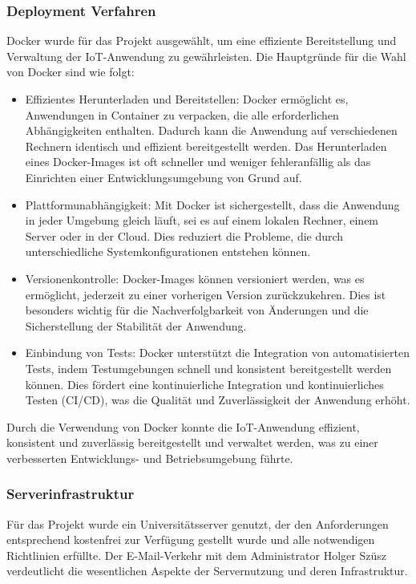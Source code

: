 \subsubsection{Deployment Verfahren}
Docker wurde für das Projekt ausgewählt, um eine effiziente Bereitstellung und Verwaltung der IoT-Anwendung zu gewährleisten. Die Hauptgründe für die Wahl von Docker sind wie folgt:

\begin{itemize}
    \item Effizientes Herunterladen und Bereitstellen: Docker ermöglicht es, Anwendungen in Container zu verpacken, die alle erforderlichen Abhängigkeiten enthalten. Dadurch kann die Anwendung auf verschiedenen Rechnern identisch und effizient bereitgestellt werden. Das Herunterladen eines Docker-Images ist oft schneller und weniger fehleranfällig als das Einrichten einer Entwicklungsumgebung von Grund auf.
    \item Plattformunabhängigkeit: Mit Docker ist sichergestellt, dass die Anwendung in jeder Umgebung gleich läuft, sei es auf einem lokalen Rechner, einem Server oder in der Cloud. Dies reduziert die Probleme, die durch unterschiedliche Systemkonfigurationen entstehen können.
    \item Versionenkontrolle: Docker-Images können versioniert werden, was es ermöglicht, jederzeit zu einer vorherigen Version zurückzukehren. Dies ist besonders wichtig für die Nachverfolgbarkeit von Änderungen und die Sicherstellung der Stabilität der Anwendung.
    \item Einbindung von Tests: Docker unterstützt die Integration von automatisierten Tests, indem Testumgebungen schnell und konsistent bereitgestellt werden können. Dies fördert eine kontinuierliche Integration und kontinuierliches Testen (CI/CD), was die Qualität und Zuverlässigkeit der Anwendung erhöht.
\end{itemize}

Durch die Verwendung von Docker konnte die IoT-Anwendung effizient, konsistent und zuverlässig bereitgestellt und verwaltet werden, was zu einer verbesserten Entwicklungs- und Betriebsumgebung führte.

\subsubsection{Serverinfrastruktur}
Für das Projekt wurde ein Universitätsserver genutzt, der den Anforderungen entsprechend kostenfrei zur Verfügung gestellt wurde und alle notwendigen Richtlinien erfüllte. Der E-Mail-Verkehr mit dem Administrator Holger Szüsz verdeutlicht die wesentlichen Aspekte der Servernutzung und deren Infrastruktur.

